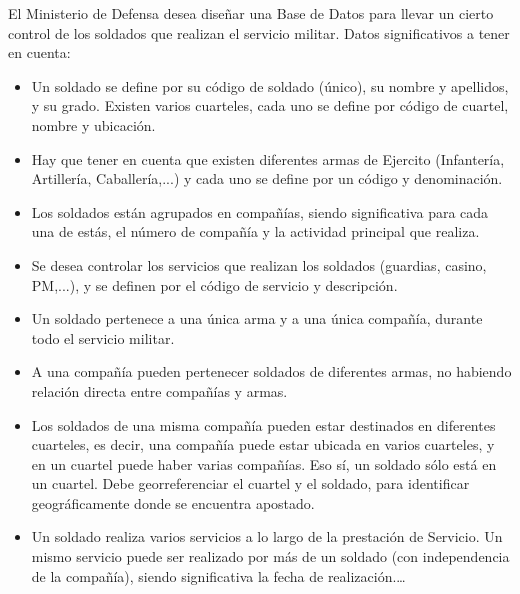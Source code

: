 El Ministerio de Defensa desea diseñar una Base de Datos para llevar un cierto control de los soldados que realizan el servicio militar. Datos significativos a tener en cuenta: 
\begin{itemize}  
\item Un soldado se define por su código de soldado (único), su nombre y apellidos, y su grado. Existen varios cuarteles, cada uno se define por código de cuartel, nombre y ubicación.
\item Hay que tener en cuenta que existen diferentes armas de Ejercito (Infantería, Artillería, Caballería,...) y cada uno se define por un código y denominación.
\item Los soldados están agrupados en compañías, siendo significativa para cada una de estás, el número de compañía y la actividad principal que realiza.
\item Se desea controlar los servicios que realizan los soldados (guardias, casino, PM,...), y se definen por el código de servicio y descripción. 
\item Un soldado pertenece a una única arma y a una única compañía, durante todo el servicio militar. 
\item A una compañía pueden pertenecer soldados de diferentes armas, no habiendo relación directa entre compañías y armas.
\item Los soldados de una misma compañía pueden estar destinados en diferentes cuarteles, es decir, una compañía puede estar ubicada en varios cuarteles, y en un cuartel puede haber varias compañías. Eso sí, un soldado sólo está en un cuartel. Debe georreferenciar el cuartel y el soldado, para identificar geográficamente donde se encuentra apostado.
\item Un soldado realiza varios servicios a lo largo de la prestación de Servicio. Un mismo servicio puede ser realizado por más de un soldado (con independencia de la compañía), siendo significativa la fecha de realización.\ldots 
\end{itemize}